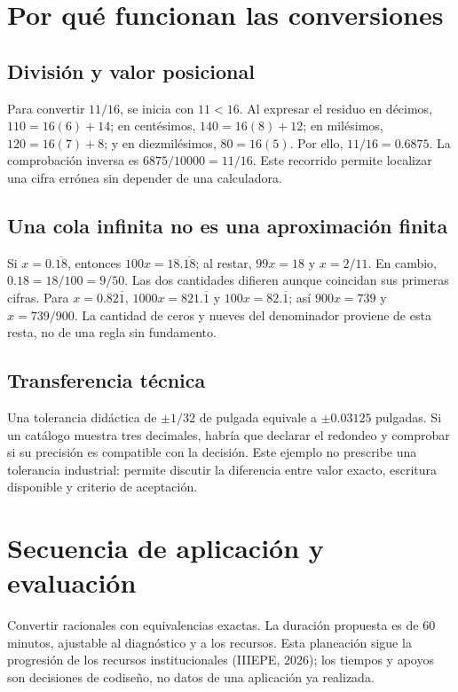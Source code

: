 \documentclass[spanish,letterpaper,oneside]{article}
\begin{document}
\section{Por qué funcionan las conversiones}
\subsection{División y valor posicional}
Para convertir $11/16$, se inicia con $11<16$. Al expresar el residuo en décimos, $110=16(6)+14$; en centésimos, $140=16(8)+12$; en milésimos, $120=16(7)+8$; y en diezmilésimos, $80=16(5)$. Por ello, $11/16=0.6875$. La comprobación inversa es $6875/10000=11/16$. Este recorrido permite localizar una cifra errónea sin depender de una calculadora.
\subsection{Una cola infinita no es una aproximación finita}
Si $x=0.\overline{18}$, entonces $100x=18.\overline{18}$; al restar, $99x=18$ y $x=2/11$. En cambio, $0.18=18/100=9/50$. Las dos cantidades difieren aunque coincidan sus primeras cifras. Para $x=0.82\overline1$, $1000x=821.\overline1$ y $100x=82.\overline1$; así $900x=739$ y $x=739/900$. La cantidad de ceros y nueves del denominador proviene de esta resta, no de una regla sin fundamento.
\subsection{Transferencia técnica}
Una tolerancia didáctica de $\pm1/32$ de pulgada equivale a $\pm0.03125$ pulgadas. Si un catálogo muestra tres decimales, habría que declarar el redondeo y comprobar si su precisión es compatible con la decisión. Este ejemplo no prescribe una tolerancia industrial: permite discutir la diferencia entre valor exacto, escritura disponible y criterio de aceptación.
\section{Secuencia de aplicación y evaluación}
Convertir racionales con equivalencias exactas. La duración propuesta es de 60 minutos, ajustable al diagnóstico y a los recursos. Esta planeación sigue la progresión de los recursos institucionales (IIIEPE, 2026); los tiempos y apoyos son decisiones de codiseño, no datos de una aplicación ya realizada.
\end{document}
